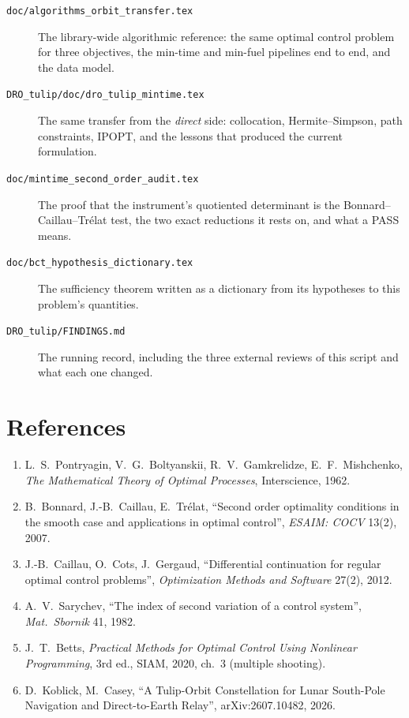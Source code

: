 \documentclass[11pt]{article}
\newcommand{\file}[1]{\texttt{#1}}
\begin{document}
\begin{description}
\item[\file{doc/algorithms\_orbit\_transfer.tex}] The library-wide algorithmic
reference: the same optimal control problem for three objectives, the min-time
and min-fuel pipelines end to end, and the data model.
\item[\file{DRO\_tulip/doc/dro\_tulip\_mintime.tex}] The same transfer from the
\emph{direct} side: collocation, Hermite--Simpson, path constraints, IPOPT, and
the lessons that produced the current formulation.
\item[\file{doc/mintime\_second\_order\_audit.tex}] The proof that the
instrument's quotiented determinant is the Bonnard--Caillau--Tr\'elat test, the
two exact reductions it rests on, and what a PASS means.
\item[\file{doc/bct\_hypothesis\_dictionary.tex}] The sufficiency theorem
written as a dictionary from its hypotheses to this problem's quantities.
\item[\file{DRO\_tulip/FINDINGS.md}] The running record, including the three
external reviews of this script and what each one changed.
\end{description}

\section*{References}

\begin{enumerate}
\item L.~S.~Pontryagin, V.~G.~Boltyanskii, R.~V.~Gamkrelidze, E.~F.~Mishchenko,
\emph{The Mathematical Theory of Optimal Processes}, Interscience, 1962.
\item B.~Bonnard, J.-B.~Caillau, E.~Tr\'elat, ``Second order optimality
conditions in the smooth case and applications in optimal control'',
\emph{ESAIM: COCV} 13(2), 2007.
\item J.-B.~Caillau, O.~Cots, J.~Gergaud, ``Differential continuation for
regular optimal control problems'', \emph{Optimization Methods and Software}
27(2), 2012.
\item A.~V.~Sarychev, ``The index of second variation of a control system'',
\emph{Mat.~Sbornik} 41, 1982.
\item J.~T.~Betts, \emph{Practical Methods for Optimal Control Using Nonlinear
Programming}, 3rd ed., SIAM, 2020, ch.~3 (multiple shooting).
\item D.~Koblick, M.~Casey, ``A Tulip-Orbit Constellation for Lunar South-Pole
Navigation and Direct-to-Earth Relay'', arXiv:2607.10482, 2026.
\end{enumerate}
\end{document}
